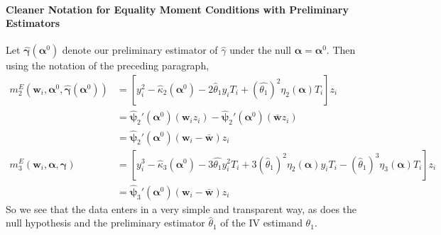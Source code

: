\documentclass[12pt]{article}
\begin{document}
\paragraph{Cleaner Notation for Equality Moment Conditions with Preliminary Estimators}
Let $\widehat{\boldsymbol{\gamma}}(\boldsymbol{\alpha}^0)$ denote our preliminary estimator of $\widehat{\gamma}$ under the null $\boldsymbol{\alpha} = \boldsymbol{\alpha}^0$. 
Then using the notation of the preceding paragraph,
\begin{align*}
  m_2^E\left(\mathbf{w}_i, \boldsymbol{\alpha}^0, \widehat{\boldsymbol{\gamma}}(\boldsymbol{\alpha}^0)\right) &= \left[y_i^2 - \widehat{\kappa}_2(\boldsymbol{\alpha}^0) - 2 \widehat{\theta}_1 y_i T_i + (\widehat{\theta_1})^2 \eta_2(\boldsymbol{\alpha}) T_i\right] z_i \\
  &= \widehat{\boldsymbol{\psi}}_2'(\boldsymbol{\alpha}^0)(\mathbf{w}_i z_i) - \widehat{\boldsymbol{\psi}}_2'(\boldsymbol{\alpha}^0) (\bar{\mathbf{w}} z_i)\\
  &= \widehat{\boldsymbol{\psi}}_2'(\boldsymbol{\alpha}^0)(\mathbf{w}_i - \bar{\mathbf{w}})z_i \\
  m_3^E(\mathbf{w}_i, \boldsymbol{\alpha}, \boldsymbol{\gamma}) &= \left[ y_i^3 - \widehat{\kappa}_3(\boldsymbol{\alpha}^0) - 3\widehat{\theta_1}  y_i^2 T_i + 3 (\widehat{\theta}_1)^2 \eta_2(\boldsymbol{\alpha})y_iT_i -  (\widehat{\theta}_1)^3\eta_3(\boldsymbol{\alpha}) T_i\right]z_i\\
  &= \widehat{\boldsymbol{\psi}}_3'(\boldsymbol{\alpha}^0)(\mathbf{w}_i - \bar{\mathbf{w}})z_i 
\end{align*}
So we see that the data enters in a very simple and transparent way, as does the null hypothesis and the preliminary estimator $\widehat{\theta}_1$ of the IV estimand $\theta_1$.
\end{document}
